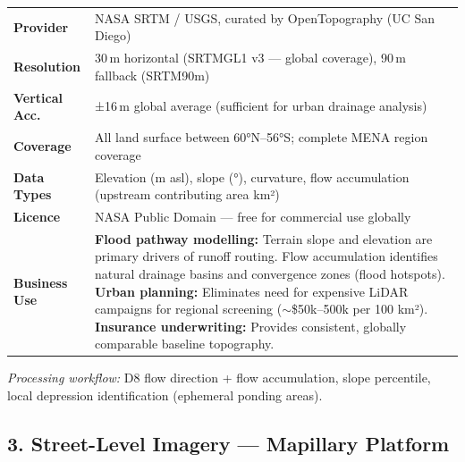 \documentclass[11pt, a4paper]{article}
\begin{document}
\begin{tabularx}{\linewidth}{>{\bfseries}p{4cm} X}
\toprule
\textbf{Provider}     & NASA SRTM / USGS, curated by OpenTopography (UC San Diego) \\
\textbf{Resolution}  & 30\,m horizontal (SRTMGL1 v3 — global coverage), 90\,m fallback (SRTM90m) \\
\textbf{Vertical Acc.} & ±16\,m global average (sufficient for urban drainage analysis) \\
\textbf{Coverage}    & All land surface between 60°N–56°S; complete MENA region coverage \\
\textbf{Data Types}  & Elevation (m asl), slope (°), curvature, flow accumulation (upstream contributing area km²) \\
\textbf{Licence}     & NASA Public Domain — free for commercial use globally \\
\textbf{Business Use} & \textbf{Flood pathway modelling:} Terrain slope and elevation are primary drivers of runoff routing. Flow accumulation identifies natural drainage basins and convergence zones (flood hotspots). \textbf{Urban planning:} Eliminates need for expensive LiDAR campaigns for regional screening ($\sim$\$50k–500k per 100 km²). \textbf{Insurance underwriting:} Provides consistent, globally comparable baseline topography. \\
\bottomrule
\end{tabularx}

\vspace{6pt}
\textit{Processing workflow:} D8 flow direction + flow accumulation, slope percentile,
local depression identification (ephemeral ponding areas).

\subsection{3. Street-Level Imagery — Mapillary Platform}
\end{document}
